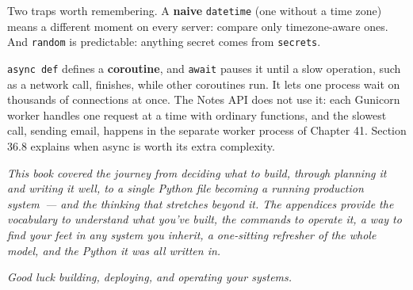 Two traps worth remembering. A \textbf{naive} \texttt{datetime} (one without a time zone) means a different moment on every server: compare only timezone-aware ones. And \texttt{random} is predictable: anything secret comes from \texttt{secrets}.

\label{44-appendices:g12-async-briefly}

\texttt{async\ def} defines a \textbf{coroutine}, and \texttt{await} pauses it until a slow operation, such as a network call, finishes, while other coroutines run. It lets one process wait on thousands of connections at once. The Notes API does not use it: each Gunicorn worker handles one request at a time with ordinary functions, and the slowest call, sending email, happens in the separate worker process of Chapter 41. Section 36.8 explains when async is worth its extra complexity.

\emph{This book covered the journey from deciding what to build, through planning it and writing it well, to a single Python file becoming a running production system~--- and the thinking that stretches beyond it. The appendices provide the vocabulary to understand what you've built, the commands to operate it, a way to find your feet in any system you inherit, a one-sitting refresher of the whole model, and the Python it was all written in.}

\emph{Good luck building, deploying, and operating your systems.}
